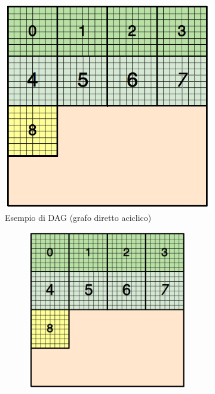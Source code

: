 \begin{figure}[H]
	\begin{subfigure}{0.4\textwidth}
		\centering
		\includegraphics[width=0.8\linewidth]{immagini/block_on_grid.png}
		\caption{Esempio di DAG (grafo diretto aciclico)}
		\label{fig:dag}
	\end{subfigure}
	\begin{subfigure}{1.0\textwidth}
		\centering
		\begin{subfigure}{0.5\textwidth}
			\centering
			\includegraphics[width=0.7\linewidth]{immagini/block_on_grid.png}
		\end{subfigure}%
		\begin{subfigure}{0.5\textwidth}
			\centering

\end{subfigure}
\end{subfigure}
\end{figure}

